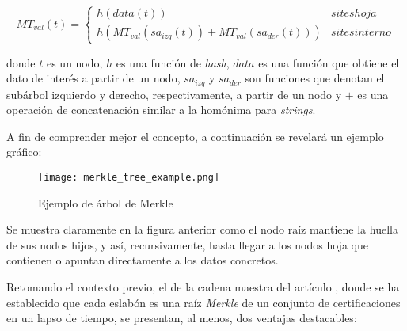 \begin{equation}
  MT_{val}(t) = \begin{cases*}
   h(data(t))  & si t es hoja\\
   h(MT_{val}(sa_{izq}(t)) + MT_{val}(sa_{der}(t)))  & si t es interno
        \end{cases*}
\end{equation}

donde $t$ es un nodo, $h$ es una función de \textit{hash}, $data$ es una función que obtiene el dato de interés a partir de un nodo, $sa_{izq}$ y $sa_{der}$ son funciones que denotan el subárbol izquierdo y derecho, respectivamente, a partir de un nodo y $+$ es una operación de concatenación similar a la homónima para \textit{strings}.

A fin de comprender mejor el concepto, a continuación se revelará un ejemplo gráfico:

\begin{figure}[H]
  \texttt{[image: merkle\_tree\_example.png]}
  \centering
  \caption{Ejemplo de árbol de Merkle }
  \label{fig:merkle-tree-example}
\end{figure}

Se muestra claramente en la figura anterior como el nodo raíz mantiene la huella de sus nodos hijos, y así, recursivamente, hasta llegar a los nodos hoja que contienen o apuntan directamente a los datos concretos.

Retomando el contexto previo, el de la cadena maestra del artículo \cite{BayerHaberStornetta1993}, donde se ha establecido que cada eslabón es una raíz \textit{Merkle} de un conjunto de certificaciones en un lapso de tiempo, se presentan, al menos, dos ventajas destacables:

